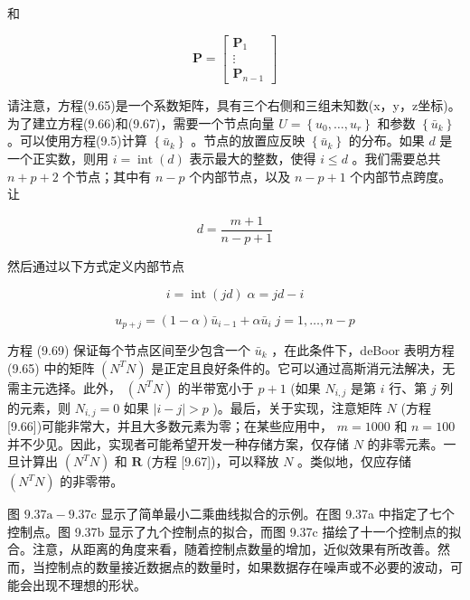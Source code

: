 \documentclass[../main.tex]{subfiles}
\begin{document}
和

\[
\mathbf{P} = \left\lbrack  \begin{matrix} {\mathbf{P}}_{1} \\  \vdots \\  {\mathbf{P}}_{n - 1} \end{matrix}\right\rbrack
\]

请注意，方程(9.65)是一个系数矩阵，具有三个右侧和三组未知数(x，y，z坐标)。为了建立方程(9.66)和(9.67)，需要一个节点向量 \(U = \left\{  {{u}_{0},\ldots ,{u}_{r}}\right\}\) 和参数 \(\left\{  {\bar{u}}_{k}\right\}\) 。可以使用方程(9.5)计算 \(\left\{  {\bar{u}}_{k}\right\}\) 。节点的放置应反映 \(\left\{  {\bar{u}}_{k}\right\}\) 的分布。如果 \(d\) 是一个正实数，则用 \(i = \operatorname{int}\left( d\right)\) 表示最大的整数，使得 \(i \leq  d\) 。我们需要总共 \(n + p + 2\) 个节点；其中有 \(n - p\) 个内部节点，以及 \(n - p + 1\) 个内部节点跨度。让

\[
d = \frac{m + 1}{n - p + 1} \tag{9.68}
\]

然后通过以下方式定义内部节点

\[
i = \operatorname{int}\left( {jd}\right) \;\alpha  = {jd} - i
\]

\[
{u}_{p + j} = \left( {1 - \alpha }\right) {\bar{u}}_{i - 1} + \alpha {\bar{u}}_{i}\;j = 1,\ldots ,n - p \tag{9.69}
\]

方程 (9.69) 保证每个节点区间至少包含一个 \({\bar{u}}_{k}\) ，在此条件下，deBoor \cite{DeBo78} 表明方程 (9.65) 中的矩阵 \(\left( {{N}^{T}N}\right)\) 是正定且良好条件的。它可以通过高斯消元法解决，无需主元选择。此外， \(\left( {{N}^{T}N}\right)\) 的半带宽小于 \(p + 1\) (如果 \({N}_{i,j}\) 是第 \(i\) 行、第 \(j\) 列的元素，则 \({N}_{i,j} = 0\) 如果 \(\left| {i - j}\right|  > p\) )。最后，关于实现，注意矩阵 \(N\) (方程 [9.66])可能非常大，并且大多数元素为零；在某些应用中， \(m = {1000}\) 和 \(n = {100}\) 并不少见。因此，实现者可能希望开发一种存储方案，仅存储 \(N\) 的非零元素。一旦计算出 \(\left( {{N}^{T}N}\right)\) 和 \(\mathbf{R}\) (方程 [9.67])，可以释放 \(N\) 。类似地，仅应存储 \(\left( {{N}^{T}N}\right)\) 的非零带。

图 \({9.37}\mathrm{a} - {9.37}\mathrm{c}\) 显示了简单最小二乘曲线拟合的示例。在图 9.37a 中指定了七个控制点。图 9.37b 显示了九个控制点的拟合，而图 9.37c 描绘了十一个控制点的拟合。注意，从距离的角度来看，随着控制点数量的增加，近似效果有所改善。然而，当控制点的数量接近数据点的数量时，如果数据存在噪声或不必要的波动，可能会出现不理想的形状。
\end{document}
